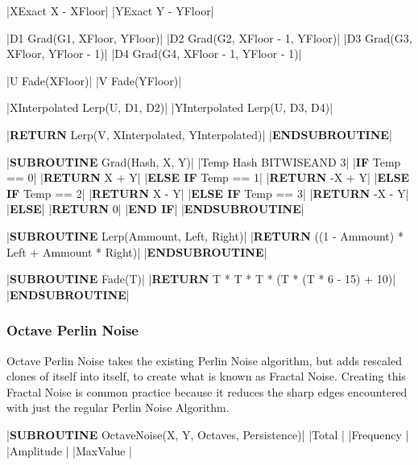 \begin{flushleft}
\begin{pseudocode}
    |XExact \leftarrow X - XFloor|
    |YExact \leftarrow Y - YFloor|

    |D1 \leftarrow Grad(G1, XFloor, YFloor)|
    |D2 \leftarrow Grad(G2, XFloor - 1, YFloor)|
    |D3 \leftarrow Grad(G3, XFloor, YFloor - 1)|
    |D4 \leftarrow Grad(G4, XFloor - 1, YFloor - 1)|

    |U \leftarrow Fade(XFloor)|
    |V \leftarrow Fade(YFloor)|

    |XInterpolated \leftarrow Lerp(U, D1, D2)|
    |YInterpolated \leftarrow Lerp(U, D3, D4)|

    |\textbf{RETURN} Lerp(V, XInterpolated, YInterpolated)|
|\textbf{ENDSUBROUTINE}|

|\textbf{SUBROUTINE} Grad(Hash, X, Y)|
    |Temp \leftarrow Hash BITWISEAND 3|
    |\textbf{IF} Temp == 0|
        |\textbf{RETURN} X + Y|
    |\textbf{ELSE IF} Temp == 1|
        |\textbf{RETURN} -X + Y|
    |\textbf{ELSE IF} Temp == 2|
        |\textbf{RETURN} X - Y|
    |\textbf{ELSE IF} Temp == 3|
        |\textbf{RETURN} -X - Y|
    |\textbf{ELSE}|
        |\textbf{RETURN} 0|
    |\textbf{END IF}|
|\textbf{ENDSUBROUTINE}|

|\textbf{SUBROUTINE} Lerp(Ammount, Left, Right)|
    |\textbf{RETURN} ((1 - Ammount) * Left + Ammount * Right)|
|\textbf{ENDSUBROUTINE}|

|\textbf{SUBROUTINE} Fade(T)|
    |\textbf{RETURN} T * T * T * (T * (T * 6 - 15) + 10)|
|\textbf{ENDSUBROUTINE}|
                \end{pseudocode}

                \vspace{0.5cm}
            \subsubsection{Octave Perlin Noise}
                Octave Perlin Noise takes the existing Perlin Noise algorithm, but adds rescaled clones of itself into itself, to create
                what is known as Fractal Noise. Creating this Fractal Noise is common practice because it reduces the sharp edges encountered
                with just the regular Perlin Noise Algorithm.

                \vspace{0.2cm}
                \begin{pseudocode}
|\textbf{SUBROUTINE} OctaveNoise(X, Y, Octaves, Persistence)|
    |Total |
    |Frequency |
    |Amplitude |
    |MaxValue |


\end{pseudocode}
\end{flushleft}
